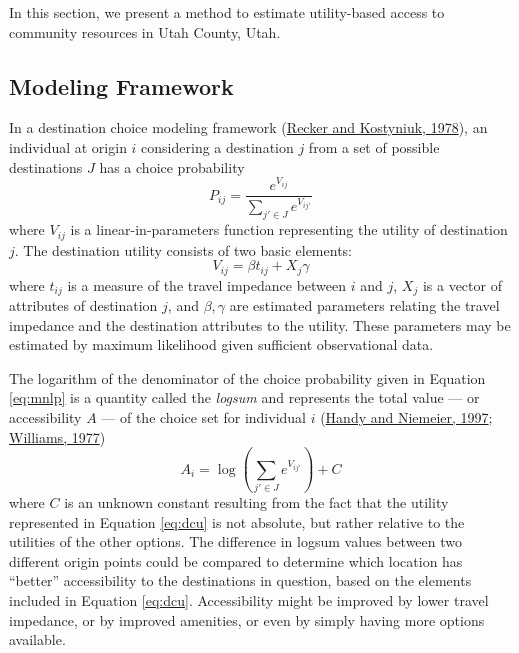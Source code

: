 \documentclass[3p, authoryear, review]{elsarticle} %
\begin{document}
In this section, we present a method to estimate utility-based access to
community resources in Utah County, Utah.

\hypertarget{framework}{%
\subsection{Modeling Framework}\label{framework}}

In a destination choice modeling framework (\protect\hyperlink{ref-recker1978}{Recker and Kostyniuk, 1978}), an individual
at origin \(i\) considering a destination \(j\) from a set of possible destinations
\(J\) has a choice probability
\begin{equation}
P_{ij} = \frac{e^{V_{ij}}}{\sum_{j' \in J} e^{V_{ij'}}}
  \label{eq:mnlp}
\end{equation}
where \(V_{ij}\) is a linear-in-parameters function representing the utility of
destination \(j\). The destination utility consists of two basic elements:
\begin{equation}
 V_{ij} = \beta t_{ij} + X_j\gamma 
  \label{eq:dcu}
\end{equation}
where \(t_{ij}\) is a measure of the travel impedance between \(i\) and \(j\), \(X_j\)
is a vector of attributes of destination \(j\), and \(\beta, \gamma\) are estimated
parameters relating the travel impedance and the destination attributes to the
utility. These parameters may be estimated by maximum likelihood given sufficient
observational data.

The logarithm of the denominator of the choice probability given in Equation
\eqref{eq:mnlp} is a quantity called the \emph{logsum} and represents the total
value --- or accessibility \(A\) --- of the choice set for individual \(i\)
(\protect\hyperlink{ref-handy1997}{Handy and Niemeier, 1997}; \protect\hyperlink{ref-williams1977formation}{Williams, 1977})
\begin{equation}
 A_i = \log\left(\sum_{j' \in J} e^{V_{ij'}}\right) + C
  \label{eq:dclogsum}
\end{equation}
where \(C\) is an unknown constant resulting from the fact that the utility
represented in Equation \eqref{eq:dcu} is not absolute, but rather relative to
the utilities of the other options. The difference in logsum values between two
different origin points could be compared to determine which location has ``better''
accessibility to the destinations in question, based on the elements included
in Equation \eqref{eq:dcu}. Accessibility might be improved by lower travel
impedance, or by improved amenities, or even by simply having more options available.
\end{document}
